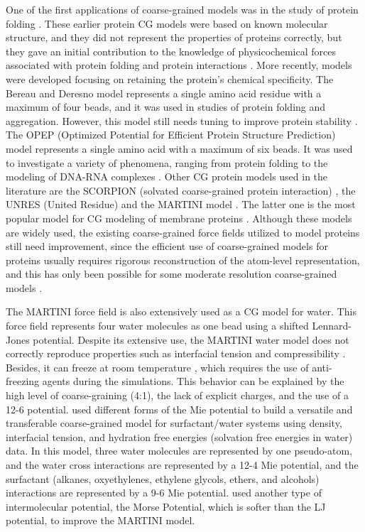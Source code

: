 One of the first applications of coarse-grained models was in the study of protein folding \cite{levitt1975,levitt1976}. These earlier protein CG models were based on known molecular structure, and they did not represent the properties of proteins correctly, but they gave an initial contribution to the knowledge of physicochemical forces associated with protein folding and protein interactions \cite{koga2001}. More recently, models were developed focusing on retaining the protein's chemical specificity. The Bereau and Deresno model \cite{bereau2009} represents a single amino acid residue with a maximum of four beads, and it was used in studies of protein folding and aggregation. However, this model still needs tuning to improve protein stability \cite{bereau2010}. The OPEP (Optimized Potential for Efficient Protein Structure Prediction) model \cite{opep2014,opep2015} represents a single amino acid with a maximum of six beads. It was used to investigate a variety of phenomena, ranging from protein folding to the modeling of DNA-RNA complexes \cite{opep2011,opep2009,opep2014}. Other CG protein models used in the literature are the SCORPION (solvated coarse-grained protein interaction)  \cite{scorpion2013}, the UNRES (United Residue) \cite{unres2014} and the MARTINI model \cite{martini2013}. The latter one is the most popular model for CG modeling of membrane proteins \cite{martini20132}. Although these models are widely used, the existing coarse-grained force fields utilized to model proteins still need improvement, since the efficient use of coarse-grained models for proteins usually requires rigorous reconstruction of the atom-level representation, and this has only been possible for some moderate resolution coarse-grained models  \cite{kmiecik2016}.

The MARTINI force field is also extensively used as a CG model for water. This force field represents four water molecules as one bead using a shifted Lennard-Jones potential. Despite its extensive use, the MARTINI water model does not correctly reproduce properties such as interfacial tension and compressibility \cite{shinoda2010}. Besides, it can freeze at room temperature \cite{winger2009,martini2007}, which requires the use of anti-freezing agents during the simulations. This behavior can be explained by the high level of coarse-graining (4:1), the lack of explicit charges, and the use of a 12-6 potential.  used different forms of the Mie potential to build a versatile and transferable coarse-grained model for surfactant/water systems using density, interfacial tension, and hydration free energies (solvation free energies in water) data. In this model, three water molecules are represented by one pseudo-atom, and the water cross interactions are represented by a 12-4 Mie potential, and the surfactant (alkanes, oxyethylenes, ethylene glycols, ethers, and alcohols) interactions are represented by a 9-6 Mie potential.  used another type of intermolecular potential, the Morse Potential, which is softer than the LJ potential, to improve the MARTINI model. 

